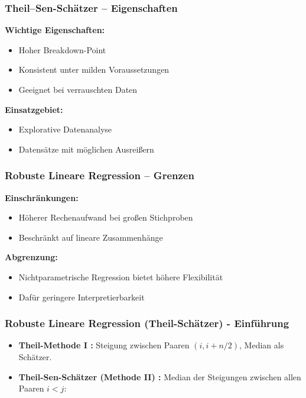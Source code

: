 \documentclass{beamer}
\begin{document}
	\begin{frame}
		\frametitle{Theil–Sen-Schätzer – Eigenschaften}
		
		\textbf{Wichtige Eigenschaften:}
		\begin{itemize}
			\item Hoher Breakdown-Point
			\item Konsistent unter milden Voraussetzungen
			\item Geeignet bei verrauschten Daten
		\end{itemize}
		
		\vspace{0.5em}
		
		\textbf{Einsatzgebiet:}
		\begin{itemize}
			\item Explorative Datenanalyse
			\item Datensätze mit möglichen Ausreißern
		\end{itemize}
	\end{frame}
	
	\begin{frame}
		\frametitle{Robuste Lineare Regression – Grenzen}
		
		\textbf{Einschränkungen:}
		\begin{itemize}
			\item Höherer Rechenaufwand bei großen Stichproben
			\item Beschränkt auf lineare Zusammenhänge
		\end{itemize}
		
		\vspace{0.5em}
		
		\textbf{Abgrenzung:}
		\begin{itemize}
			\item Nichtparametrische Regression bietet höhere Flexibilität
			\item Dafür geringere Interpretierbarkeit
		\end{itemize}
	\end{frame}
	
	
	\begin{frame}
		\frametitle{Robuste Lineare Regression (Theil-Schätzer) - Einführung}
		
		\begin{itemize}
			\item \textbf{Theil-Methode I \cite{Theil1950}:} Steigung zwischen Paaren $(i, i+n/2)$, Median als Schätzer.
			\item \textbf{Theil-Sen-Schätzer (Methode II) \cite{Theil1950, Sen1968}:} Median der Steigungen zwischen allen Paaren $i < j$:
		\end{itemize}
	\end{frame}
	
\end{document}

